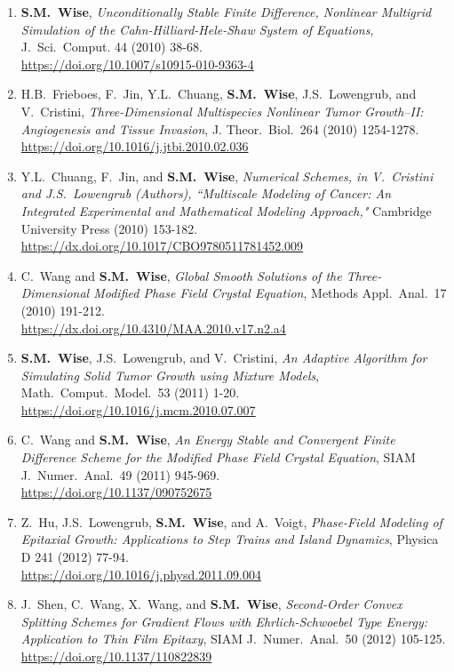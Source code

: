 \documentclass[11pt]{letter}
\begin{document}
\begin{enumerate}
    \item
\textbf{S.M.~Wise}, {\sl Unconditionally Stable Finite Difference, Nonlinear Multigrid Simulation of the Cahn-Hilliard-Hele-Shaw System of Equations}, J.~Sci.~Comput. 44 (2010) 38-68.
	\\
\url{https://doi.org/10.1007/s10915-010-9363-4}
	\item
H.B.~Frieboes, F.~Jin, Y.L.~Chuang, \textbf{S.M.~Wise}, J.S.~Lowengrub, and V.~Cristini, {\sl Three-Dimensional Multispecies Nonlinear Tumor Growth--II: Angiogenesis and Tissue Invasion}, J. Theor.~Biol.~264 (2010) 1254-1278.
	\\
\url{https://doi.org/10.1016/j.jtbi.2010.02.036}

	\item
Y.L.~Chuang, F.~Jin, and \textbf{S.M.~Wise}, {\sl Numerical Schemes, in V.~Cristini and J.S.~Lowengrub (Authors), ``Multiscale Modeling of Cancer: An Integrated Experimental and Mathematical Modeling Approach,"} Cambridge University Press (2010) 153-182.
	\\
\url{https://dx.doi.org/10.1017/CBO9780511781452.009}

	\item
C.~Wang and \textbf{S.M.~Wise}, {\sl Global Smooth Solutions of the Three-Dimensional Modified Phase Field Crystal Equation}, Methods Appl.~Anal.~17 (2010) 191-212.
	\\
\url{https://dx.doi.org/10.4310/MAA.2010.v17.n2.a4}

    \item
\textbf{S.M.~Wise}, J.S.~Lowengrub, and V.~Cristini, {\sl An Adaptive Algorithm for Simulating Solid Tumor Growth using Mixture Models}, Math.~Comput.~Model.~53 (2011) 1-20.
	\\
\url{https://doi.org/10.1016/j.mcm.2010.07.007}
 
	\item
C.~Wang and \textbf{S.M.~Wise}, {\sl An Energy Stable and Convergent Finite Difference Scheme for the Modified Phase Field Crystal Equation}, SIAM J.~Numer.~Anal.~49 (2011) 945-969.
	\\
\url{https://doi.org/10.1137/090752675}

	\item
Z.~Hu, J.S.~Lowengrub, \textbf{S.M.~Wise}, and A.~Voigt, {\sl Phase-Field Modeling of Epitaxial Growth: Applications to Step Trains and Island Dynamics}, Physica D 241 (2012) 77-94.
	\\
\url{https://doi.org/10.1016/j.physd.2011.09.004}

	\item
J.~Shen, C.~Wang, X.~Wang, and \textbf{S.M.~Wise}, {\sl Second-Order Convex Splitting Schemes for Gradient Flows with Ehrlich-Schwoebel Type Energy: Application to Thin Film Epitaxy}, SIAM J.~Numer.~Anal.~50 (2012) 105-125.
	\\
\url{https://doi.org/10.1137/110822839}
    

\end{enumerate}
\end{document}
